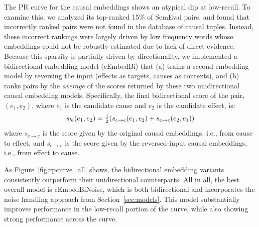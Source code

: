 The PR curve for the causal embeddings shows an atypical dip at low-recall.  To examine this, we analyzed its top-ranked 15\% of SemEval pairs, and found that incorrectly ranked pairs were not found in the database of causal tuples.  Instead, these incorrect rankings were largely driven by low frequency words whose embeddings could not be robustly estimated due to lack of direct evidence.  
Because this sparsity is partially driven by directionality, 
we implemented a bidirectional embedding model (cEmbedBi) that (a) trains a second embedding model by reversing the input (effects as targets, causes as contexts), and (b) ranks pairs by the \textit{average} of the scores returned by these two unidirectional causal embedding models. 
Specifically, the final bidirectional score of the pair, $(e_1, e_2)$, where $e_1$ is the candidate cause and $e_2$ is the candidate effect, is:
\begin{equation}
s_{bi}(e_1, e_2) = \tfrac{1}{2}(s_{c{\tiny \rightarrow}e}(e_1, e_2) + s_{e \rightarrow c}(e_2, e_1))
\end{equation}
where $s_{c \rightarrow e}$ is the score given by the original causal embeddings, i.e., from cause to effect, and $s_{e \rightarrow c}$ is the score given by the reversed-input causal embeddings, i.e., from effect to cause.

As Figure~\ref{fig:rpcurve_all} shows, the bidirectional embedding variants consistently outperform their unidirectional counterparts. 
All in all, the best overall model is cEmbedBiNoise, which is both bidirectional and incorporates the noise handling approach from Section~\ref{sec:models}. This model substantially improves performance in the low-recall portion of the curve, while also showing strong performance across the curve. 



